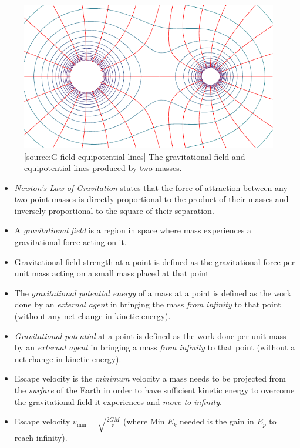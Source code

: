 \documentclass[oneside]{book}
\begin{document}
\begin{figure}[H]
    \centering
    \includegraphics[scale=1.1]{../images/Gravitational-fields-illustration.pdf}
    \caption{\ref{source:G-field-equipotential-lines} The gravitational field and equipotential lines produced by two masses.}
    \label{fig:G-field-equipotential-lines}
\end{figure}
\begin{itemize}
    \item \emph{Newton's Law of Gravitation} states that the force of attraction between any two point masses is directly proportional to the product of their masses and inversely proportional to the square of their separation.
    \item A \emph{gravitational field} is a region in space where mass experiences a gravitational force acting on it.
    \item Gravitational field strength at a point is defined as the gravitational force per unit mass acting on a small mass placed at that point
    \item The \emph{gravitational potential energy} of a mass at a point is defined as the work done by an \emph{external agent} in bringing the mass \emph{from infinity} to that point (without any net change in kinetic energy).
    \item \emph{Gravitational potential} at a point is defined as the work done per unit mass by an \emph{external agent} in bringing a mass \emph{from infinity} to that point (without a net change in kinetic energy).
    \item Escape velocity is the \emph{minimum} velocity a mass needs to be projected from the \emph{surface} of the Earth in order to have sufficient kinetic energy to overcome the gravitational field it experiences and \emph{move to infinity}.
    \item Escape velocity \(v_\text{min}=\sqrt{\frac{2GM}{r}}\) (where Min \(E_k\) needed is the gain in \(E_p\) to reach infinity).
\end{itemize}
\end{document}
